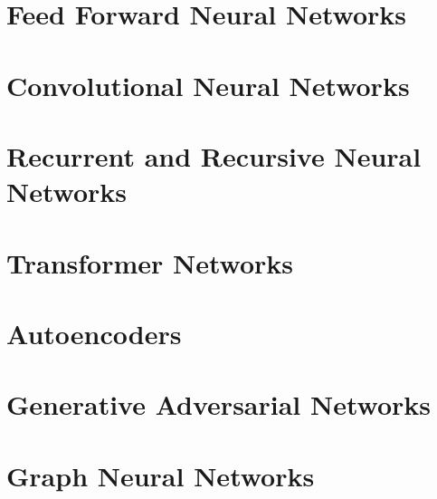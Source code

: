 \section{Feed Forward Neural Networks}


\section{Convolutional Neural Networks}


\section{Recurrent and Recursive Neural Networks}


\section{Transformer Networks}


\section{Autoencoders}


\section{Generative Adversarial Networks}


\section{Graph Neural Networks}

